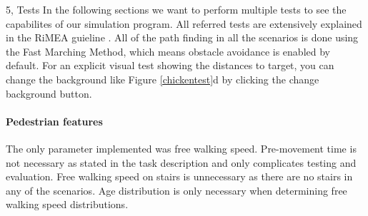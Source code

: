 \begin{task}{5, Tests}
In the following sections we want to perform multiple tests to see the capabilites of our simulation program. All referred tests are extensively explained in the RiMEA guieline \cite{rimea2016}. All of the path finding in all the scenarios is done using the Fast Marching Method, which means obstacle avoidance is enabled by default. For an explicit visual test showing the distances to target, you can change the background like Figure \ref{chickentest}d by clicking the change background button.

\paragraph{Pedestrian features}
The only parameter implemented was free walking speed. Pre-movement time is not necessary as stated in the task description and only complicates testing and evaluation. Free walking speed on stairs is unnecessary as there are no stairs in any of the scenarios. Age distribution is only necessary when determining free walking speed distributions.


\end{task}

